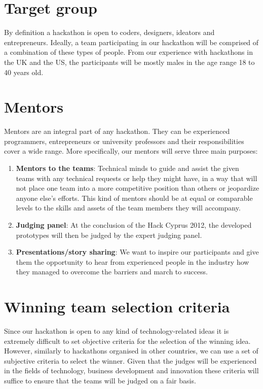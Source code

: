 \documentclass[a4paper,11pt]{report}
\begin{document}
\section{Target group}
By definition a hackathon is open to coders, designers, ideators and entrepreneurs. Ideally, a team participating in our hackathon will
be comprised of a combination of these types of people. From our experience with hackathons in the UK and the US, the participants will be mostly males in the age range 18 to 40 years old.   

\section{Mentors}
Mentors are an integral part of any hackathon. They can be experienced programmers, entrepreneurs or university professors and their responsibilities cover a wide range. More specifically, our mentors will serve three main purposes:
\begin{enumerate}
  \item \textbf{Mentors to the teams}: Technical minds to guide and assist the given teams with any technical requests or help they might have, in a way that will not place one team into a more competitive position than others or jeopardize anyone else’s efforts. This kind of mentors should   be at equal or comparable levels to the skills and assets of the team members they will accompany.
  \item \textbf{Judging panel}: At the conclusion of the Hack Cyprus 2012, the developed prototypes will then be judged by the expert judging panel.
  \item \textbf{Presentations/story sharing}: We want to inspire our participants and give them the opportunity to hear from experienced people in the industry how they managed to overcome the barriers and march to success. 
\end{enumerate}

\section{Winning team selection criteria}
Since our hackathon is open to any kind of technology-related ideas it is extremely difficult to set objective criteria for the selection of the winning idea. However, similarly to hackathons organised in other countries, we can use a set of subjective criteria to select the winner. Given that the judges will be experienced in the fields of technology, business development and innovation these criteria will suffice to ensure that the teams will be judged on a fair basis.
\end{document}
